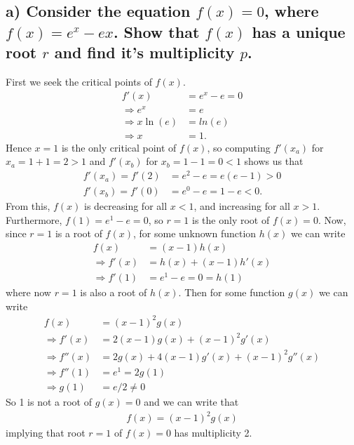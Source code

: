 \documentclass[11pt, letterpaper]{article}
\begin{document}
\subsection*{a) \normalfont Consider the equation $f(x)=0$, where $f(x)=e^x-ex$. Show that $f(x)$ has a unique
root $r$ and find it's multiplicity $p$.}
First we seek the critical points of $f(x)$.
\begin{align*}
    f'(x)&=e^x-e=0\\
    \Rightarrow e^x&=e\\
    \Rightarrow x\ln(e)&=ln(e)\\
    \Rightarrow x&=1.
\end{align*}
Hence $x=1$ is the only critical point of $f(x)$, so computing $f'(x_a)$ for $x_a=1+1=2>1$ and $f'(x_b)$ for $x_b=1-1=0<1$ shows us that
\begin{align*}
    f'(x_a)=f'(2)&= e^2-e=e(e-1)>0\\
    f'(x_b)=f'(0)&= e^0-e=1-e<0.
\end{align*}
From this, $f(x)$ is decreasing for all $x<1$, and increasing for all $x>1$. Furthermore, $f(1)=e^1-e=0$, so
$r=1$ is the only root of $f(x)=0$. Now, since $r=1$ is a root of $f(x)$, for some unknown function $h(x)$ we can write
\begin{align*}
    f(x)&=(x-1)h(x)\\
    \Rightarrow f'(x)&=h(x)+(x-1)h'(x)\\
    \Rightarrow f'(1)&=e^1-e=0=h(1)
\end{align*} 
where now $r=1$ is also a root of $h(x)$. Then for some function $g(x)$ we can write
\begin{align*}
    f(x)&=(x-1)^2g(x)\\
    \Rightarrow f'(x)&=2(x-1)g(x)+(x-1)^2g'(x)\\
    \Rightarrow f''(x)&=2g(x)+4(x-1)g'(x)+(x-1)^2g''(x)\\
    \Rightarrow f''(1)&=e^1=2g(1)\\
    \Rightarrow g(1)&=e/2\neq 0
\end{align*}
So 1 is not a root of $g(x)=0$ and we can write that
\begin{align*}
    f(x)=(x-1)^2g(x)
\end{align*}
implying that root $r=1$ of $f(x)=0$ has multiplicity 2.
\newpage
\end{document}
